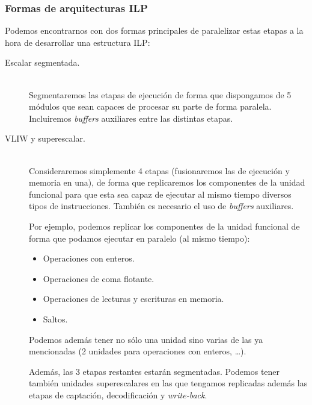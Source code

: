\subsubsection{Formas de arquitecturas ILP}
Podemos encontrarnos con dos formas principales de paralelizar estas etapas a la hora de desarrollar una estructura ILP\@:
\begin{description}
    \item [Escalar segmentada.]~\\ Segmentaremos las etapas de ejecución de forma que dispongamos de 5 módulos que sean capaces de procesar su parte de forma paralela. Incluiremos \emph{buffers} auxiliares entre las distintas etapas.
    \item [VLIW y superescalar.]~\\ Consideraremos simplemente 4 etapas (fusionaremos las de ejecución y memoria en una), de forma que replicaremos los componentes de la unidad funcional para que esta sea capaz de ejecutar al mismo tiempo diversos tipos de instrucciones. También es necesario el uso de \emph{buffers} auxiliares.

        Por ejemplo, podemos replicar los componentes de la unidad funcional de forma que podamos ejecutar en paralelo (al mismo tiempo):
        \begin{itemize}
            \item Operaciones con enteros.
            \item Operaciones de coma flotante.
            \item Operaciones de lecturas y escrituras en memoria.
            \item Saltos.
        \end{itemize}
        Podemos además tener no sólo una unidad sino varias de las ya mencionadas (2 unidades para operaciones con enteros, \ldots).

        Además, las 3 etapas restantes estarán segmentadas. Podemos tener también unidades superescalares en las que tengamos replicadas además las etapas de captación, decodificación y \emph{write-back}.
\end{description}

